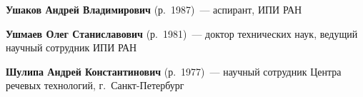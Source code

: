 \begin{multicols}{2}
\noindent
\textbf{Ушаков Андрей Владимирович} (р.\ 1987)~--- аспирант, ИПИ РАН

\vspace*{6pt}

\noindent
\textbf{Ушмаев Олег Станиславович} (р.\ 1981)~--- 
доктор технических наук, ведущий научный сотрудник ИПИ РАН 

\vspace*{6pt}

\noindent
\textbf{Шулипа Андрей Константинович} (р.\ 1977)~--- 
научный сотрудник Центра речевых технологий, г.~Санкт-Пе\-тер\-бург

\end{multicols}

\newpage